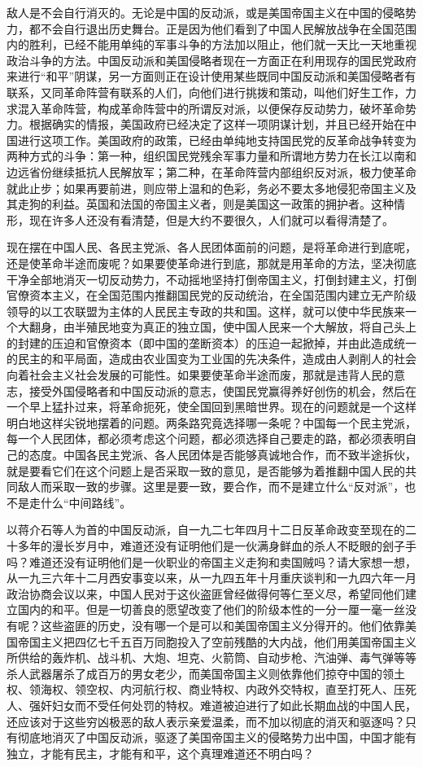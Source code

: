 敌人是不会自行消灭的。无论是中国的反动派，或是美国帝国主义在中国的侵略势力，都不会自行退出历史舞台。正是因为他们看到了中国人民解放战争在全国范围内的胜利，已经不能用单纯的军事斗争的方法加以阻止，他们就一天比一天地重视政治斗争的方法。中国反动派和美国侵略者现在一方面正在利用现存的国民党政府来进行“和平”阴谋，另一方面则正在设计使用某些既同中国反动派和美国侵略者有联系，又同革命阵营有联系的人们，向他们进行挑拨和策动，叫他们好生工作，力求混入革命阵营，构成革命阵营中的所谓反对派，以便保存反动势力，破坏革命势力。根据确实的情报，美国政府已经决定了这样一项阴谋计划，并且已经开始在中国进行这项工作。美国政府的政策，已经由单纯地支持国民党的反革命战争转变为两种方式的斗争：第一种，组织国民党残余军事力量和所谓地方势力在长江以南和边远省份继续抵抗人民解放军；第二种，在革命阵营内部组织反对派，极力使革命就此止步；如果再要前进，则应带上温和的色彩，务必不要太多地侵犯帝国主义及其走狗的利益。英国和法国的帝国主义者，则是美国这一政策的拥护者。这种情形，现在许多人还没有看清楚，但是大约不要很久，人们就可以看得清楚了。

现在摆在中国人民、各民主党派、各人民团体面前的问题，是将革命进行到底呢，还是使革命半途而废呢？如果要使革命进行到底，那就是用革命的方法，坚决彻底干净全部地消灭一切反动势力，不动摇地坚持打倒帝国主义，打倒封建主义，打倒官僚资本主义，在全国范围内推翻国民党的反动统治，在全国范围内建立无产阶级领导的以工农联盟为主体的人民民主专政的共和国。这样，就可以使中华民族来一个大翻身，由半殖民地变为真正的独立国，使中国人民来一个大解放，将自己头上的封建的压迫和官僚资本（即中国的垄断资本）的压迫一起掀掉，并由此造成统一的民主的和平局面，造成由农业国变为工业国的先决条件，造成由人剥削人的社会向着社会主义社会发展的可能性。如果要使革命半途而废，那就是违背人民的意志，接受外国侵略者和中国反动派的意志，使国民党赢得养好创伤的机会，然后在一个早上猛扑过来，将革命扼死，使全国回到黑暗世界。现在的问题就是一个这样明白地这样尖锐地摆着的问题。两条路究竟选择哪一条呢？中国每一个民主党派，每一个人民团体，都必须考虑这个问题，都必须选择自己要走的路，都必须表明自己的态度。中国各民主党派、各人民团体是否能够真诚地合作，而不致半途拆伙，就是要看它们在这个问题上是否采取一致的意见，是否能够为着推翻中国人民的共同敌人而采取一致的步骤。这里是要一致，要合作，而不是建立什么“反对派”，也不是走什么“中间路线”。

以蒋介石等人为首的中国反动派，自一九二七年四月十二日反革命政变至现在的二十多年的漫长岁月中，难道还没有证明他们是一伙满身鲜血的杀人不眨眼的刽子手吗？难道还没有证明他们是一伙职业的帝国主义走狗和卖国贼吗？请大家想一想，从一九三六年十二月西安事变以来，从一九四五年十月重庆谈判和一九四六年一月政治协商会议以来，中国人民对于这伙盗匪曾经做得何等仁至义尽，希望同他们建立国内的和平。但是一切善良的愿望改变了他们的阶级本性的一分一厘一毫一丝没有呢？这些盗匪的历史，没有哪一个是可以和美国帝国主义分得开的。他们依靠美国帝国主义把四亿七千五百万同胞投入了空前残酷的大内战，他们用美国帝国主义所供给的轰炸机、战斗机、大炮、坦克、火箭筒、自动步枪、汽油弹、毒气弹等等杀人武器屠杀了成百万的男女老少，而美国帝国主义则依靠他们掠夺中国的领土权、领海权、领空权、内河航行权、商业特权、内政外交特权，直至打死人、压死人、强奸妇女而不受任何处罚的特权。难道被迫进行了如此长期血战的中国人民，还应该对于这些穷凶极恶的敌人表示亲爱温柔，而不加以彻底的消灭和驱逐吗？只有彻底地消灭了中国反动派，驱逐了美国帝国主义的侵略势力出中国，中国才能有独立，才能有民主，才能有和平，这个真理难道还不明白吗？

